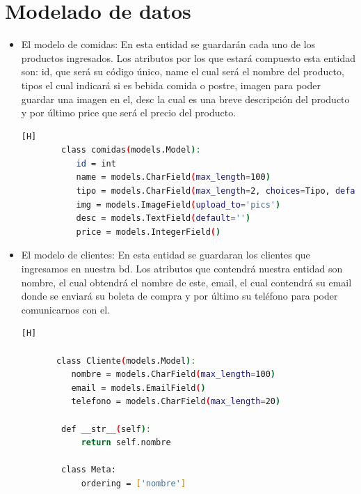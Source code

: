 \documentclass{article}
\begin{document}
	\section{Modelado de datos}
	\begin{itemize}
		\item El modelo de comidas: En esta entidad se guardarán cada uno de los productos ingresados. Los atributos por los que estará compuesto esta entidad son: id, que será su código único, name el cual será el nombre del producto, tipos el cual indicará si es bebida comida o postre, imagen para poder guardar una imagen en el, desc la cual es una breve descripción del producto y por último price que será el precio del producto.
        \begin{lstlisting}[language=bash,caption={Modelado de comidas}][H]
		class comidas(models.Model):
           id = int
           name = models.CharField(max_length=100)
           tipo = models.CharField(max_length=2, choices=Tipo, default='4')
           img = models.ImageField(upload_to='pics')
           desc = models.TextField(default='')
           price = models.IntegerField()

  	\end{lstlisting}
		\item El modelo de  clientes: En esta entidad se guardaran los clientes que ingresamos en nuestra bd. Los atributos que contendrá nuestra entidad son nombre, el cual obtendrá el nombre de este, email, el cual contendrá su email donde se enviará su boleta de compra y por último su teléfono para poder comunicarnos con el.
        \begin{lstlisting}[language=bash,caption={Modelo de clientes}][H]
		
       class Cliente(models.Model):
          nombre = models.CharField(max_length=100)
          email = models.EmailField()
          telefono = models.CharField(max_length=20)

        def __str__(self):
            return self.nombre
    
        class Meta:
            ordering = ['nombre']


\end{lstlisting}
\end{itemize}
\end{document}
